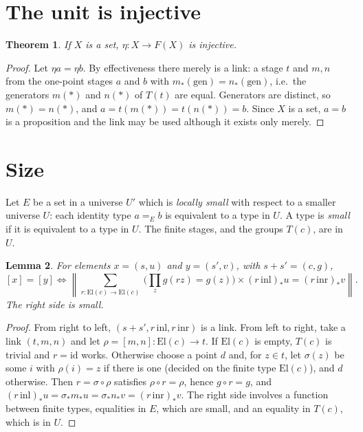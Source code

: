 \documentclass[11pt]{amsart}
\newtheorem{theorem}{Theorem}[section]
\newtheorem{lemma}[theorem]{Lemma}
\theoremstyle{definition}
\theoremstyle{remark}
\newcommand{\mere}[1]{\left\lVert #1\right\rVert}
\newcommand{\El}{\mathrm{El}}
\begin{document}
\section{The unit is injective}

\begin{theorem}\label{thm:inj}
If $X$ is a set, $\eta:X\to F(X)$ is injective.
\end{theorem}
\begin{proof}
Let $\eta a=\eta b$. By effectiveness there merely is a link: a stage
$t$ and $m,n$ from the one-point stages $a$ and $b$ with
$m_*(\text{gen})=n_*(\text{gen})$, i.e.\ the generators $m(*)$ and $n(*)$
of $T(t)$ are equal. Generators are distinct, so $m(*)=n(*)$, and
$a=t(m(*))=t(n(*))=b$. Since $X$ is a set, $a=b$ is a proposition and the
link may be used although it exists only merely.
\end{proof}

\section{Size}

Let $E$ be a set in a universe $U'$ which is \emph{locally small} with
respect to a smaller universe $U$: each identity type $a=_E b$ is
equivalent to a type in $U$. A type is \emph{small} if it is equivalent
to a type in $U$. The finite stages, and the groups $T(c)$, are in $U$.

\begin{lemma}\label{lem:smalllink}
For elements $x=(s,u)$ and $y=(s',v)$, with $s+s'=(c,g)$,
\[
[x]=[y]\iff \mere{\textstyle\sum_{r:\El(c)\to\El(c)}\ \big(\prod_z g(r z)=g(z)\big)\times
(r\,\mathrm{inl})_*u=(r\,\mathrm{inr})_*v}.
\]
The right side is small.
\end{lemma}
\begin{proof}
From right to left, $(s+s',r\,\mathrm{inl},r\,\mathrm{inr})$ is a link.
From left to right, take a link $(t,m,n)$ and let $\rho=[m,n]:\El(c)\to
t$. If $\El(c)$ is empty, $T(c)$ is trivial and $r=\mathrm{id}$ works.
Otherwise choose a point $d$ and, for $z\in t$, let $\sigma(z)$ be some
$i$ with $\rho(i)=z$ if there is one (decided on the finite type
$\El(c)$), and $d$ otherwise. Then $r=\sigma\circ\rho$ satisfies
$\rho\circ r=\rho$, hence $g\circ r=g$, and
$(r\,\mathrm{inl})_*u=\sigma_*m_*u=\sigma_*n_*v=(r\,\mathrm{inr})_*v$.
The right side involves a function between finite types, equalities in
$E$, which are small, and an equality in $T(c)$, which is in $U$.
\end{proof}
\end{document}
